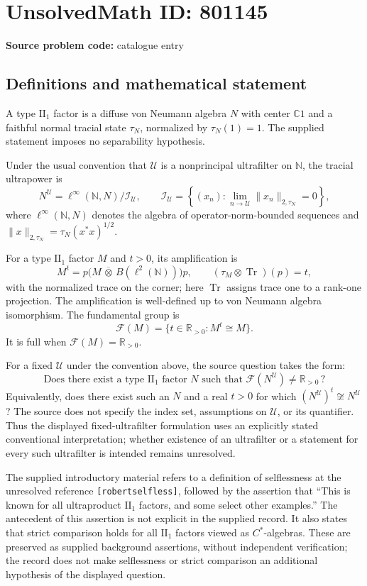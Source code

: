 \documentclass[11pt]{article}
\newcommand{\N}{\mathbb{N}}
\newcommand{\R}{\mathbb{R}}
\newcommand{\C}{\mathbb{C}}
\begin{document}
\section*{UnsolvedMath ID: 801145}
\textbf{Source problem code:} catalogue entry
\subsection{Definitions and mathematical statement}
A type \(\mathrm{II}_1\) factor is a diffuse von Neumann algebra \(N\) with center \(\C 1\) and a faithful normal tracial state \(\tau_N\), normalized by \(\tau_N(1)=1\). The supplied statement imposes no separability hypothesis.

Under the usual convention that \(\mathcal U\) is a nonprincipal ultrafilter on \(\N\), the tracial ultrapower is
\[
N^{\mathcal U}=\ell^\infty(\N,N)\big/\mathcal I_{\mathcal U},\qquad
\mathcal I_{\mathcal U}=\left\{(x_n):\lim_{n\to\mathcal U}\|x_n\|_{2,\tau_N}=0\right\},
\]
where \(\ell^\infty(\N,N)\) denotes the algebra of operator-norm-bounded sequences and \(\|x\|_{2,\tau_N}=\tau_N(x^*x)^{1/2}\).

For a type \(\mathrm{II}_1\) factor \(M\) and \(t>0\), its amplification is
\[
M^t=p\bigl(M\,\overline\otimes\,B(\ell^2(\N))\bigr)p,
\qquad (\tau_M\otimes\operatorname{Tr})(p)=t,
\]
with the normalized trace on the corner; here \(\operatorname{Tr}\) assigns trace one to a rank-one projection. The amplification is well-defined up to von Neumann algebra isomorphism. The fundamental group is
\[
\mathcal F(M)=\{t\in\R_{>0}:M^t\cong M\}.
\]
It is full when \(\mathcal F(M)=\R_{>0}\).

For a fixed \(\mathcal U\) under the convention above, the source question takes the form:
\[
\text{Does there exist a type }\mathrm{II}_1\text{ factor }N
\text{ such that }\mathcal F(N^{\mathcal U})\ne\R_{>0}\,?
\]
Equivalently, does there exist such an \(N\) and a real \(t>0\) for which \((N^{\mathcal U})^t\not\cong N^{\mathcal U}\)? The source does not specify the index set, assumptions on \(\mathcal U\), or its quantifier. Thus the displayed fixed-ultrafilter formulation uses an explicitly stated conventional interpretation; whether existence of an ultrafilter or a statement for every such ultrafilter is intended remains unresolved.

The supplied introductory material refers to a definition of selflessness at the unresolved reference \texttt{[robertselfless]}, followed by the assertion that ``This is known for all ultraproduct \(\mathrm{II}_1\) factors, and some select other examples.'' The antecedent of this assertion is not explicit in the supplied record. It also states that strict comparison holds for all \(\mathrm{II}_1\) factors viewed as \(C^*\)-algebras. These are preserved as supplied background assertions, without independent verification; the record does not make selflessness or strict comparison an additional hypothesis of the displayed question.
\end{document}
